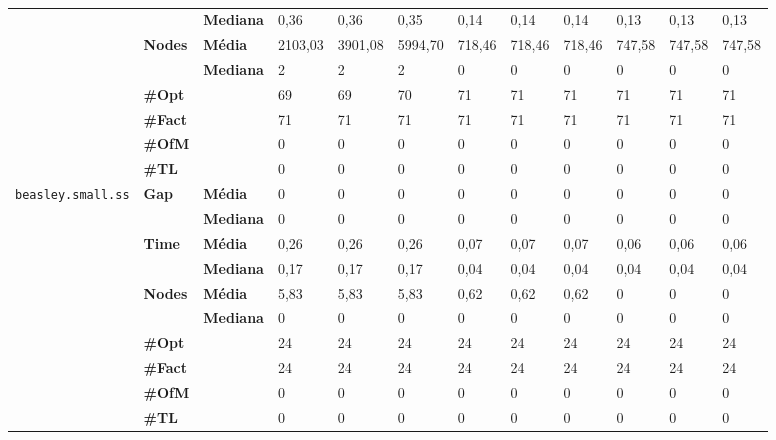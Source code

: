 \begin{table}[]
\begin{footnotesize}
\begin{adjustbox}{angle=90}
\begin{tabular}{c@{\hskip 0.2cm}l@{\hskip 0.1cm}l|lll|lll|lll}
 & & \textbf{Mediana} & 0,36 & 0,36 & 0,35 & 0,14 & 0,14 & 0,14 & 0,13 & 0,13 & 0,13 \\
\cline{2-12}
 & \multirow{2}{*}{\textbf{Nodes}} & \textbf{Média} & 2103,03 & 3901,08 & 5994,70 & 718,46 & 718,46 & 718,46 & 747,58 & 747,58 & 747,58 \\
 & & \textbf{Mediana} & 2 & 2 & 2 & 0 & 0 & 0 & 0 & 0 & 0 \\
\cline{2-12}
 & \textbf{\#Opt} & & 69 & 69 & 70 & 71 & 71 & 71 & 71 & 71 & 71 \\
 & \textbf{\#Fact} & & 71 & 71 & 71 & 71 & 71 & 71 & 71 & 71 & 71 \\
 & \textbf{\#OfM} & & 0 & 0 & 0 & 0 & 0 & 0 & 0 & 0 & 0 \\
 & \textbf{\#TL} & & 0 & 0 & 0 & 0 & 0 & 0 & 0 & 0 & 0 \\
\hline
\multirow{7}{*}{\texttt{beasley.small.ss}} & \multirow{2}{*}{\textbf{Gap}} & \textbf{Média} & 0 & 0 & 0 & 0 & 0 & 0 & 0 & 0 & 0 \\
 & & \textbf{Mediana} & 0 & 0 & 0 & 0 & 0 & 0 & 0 & 0 & 0 \\
\cline{2-12}
 & \multirow{2}{*}{\textbf{Time}} & \textbf{Média} & 0,26 & 0,26 & 0,26 & 0,07 & 0,07 & 0,07 & 0,06 & 0,06 & 0,06 \\
 & & \textbf{Mediana} & 0,17 & 0,17 & 0,17 & 0,04 & 0,04 & 0,04 & 0,04 & 0,04 & 0,04 \\
\cline{2-12}
 & \multirow{2}{*}{\textbf{Nodes}} & \textbf{Média} & 5,83 & 5,83 & 5,83 & 0,62 & 0,62 & 0,62 & 0 & 0 & 0 \\
 & & \textbf{Mediana} & 0 & 0 & 0 & 0 & 0 & 0 & 0 & 0 & 0 \\
\cline{2-12}
 & \textbf{\#Opt} & & 24 & 24 & 24 & 24 & 24 & 24 & 24 & 24 & 24 \\
 & \textbf{\#Fact} & & 24 & 24 & 24 & 24 & 24 & 24 & 24 & 24 & 24 \\
 & \textbf{\#OfM} & & 0 & 0 & 0 & 0 & 0 & 0 & 0 & 0 & 0 \\
 & \textbf{\#TL} & & 0 & 0 & 0 & 0 & 0 & 0 & 0 & 0 & 0 \\
	\end{tabular}
	\end{adjustbox}
	\end{footnotesize}
	\caption{}
	\label{cflp:tab:1}
\end{table}

